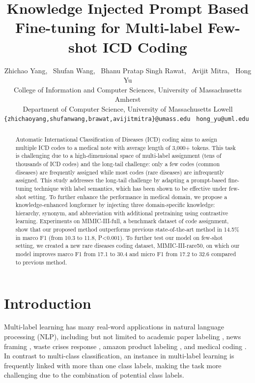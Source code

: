 \documentclass[11pt]{article}
\title{Knowledge Injected Prompt Based Fine-tuning for Multi-label Few-shot ICD Coding}
\author{
Zhichao Yang, \ Shufan Wang, \ Bhanu Pratap Singh Rawat, \ Avijit Mitra, \ Hong Yu \\
 College of Information and Computer Sciences, University of Massachusetts Amherst\\
 Department of Computer Science, University of Massachusetts Lowell\\
{\tt \{zhichaoyang,shufanwang,brawat,avijitmitra\}@umass.edu } {\tt hong\_yu@uml.edu } \\
}
\begin{document}
\maketitle
\begin{abstract}
Automatic International Classification of Diseases (ICD) coding aims to assign multiple ICD codes to a medical note with average length of 3,000+ tokens. This task is challenging due to a high-dimensional space of multi-label assignment (tens of thousands of ICD codes) and the long-tail challenge: only a few codes (common diseases) are frequently assigned while most codes (rare diseases) are infrequently assigned. This study addresses the long-tail challenge by adapting a prompt-based fine-tuning technique with label semantics, which has been shown to be effective under few-shot setting. To further enhance the performance in medical domain, we propose a knowledge-enhanced longformer by injecting three domain-specific knowledge:  hierarchy, synonym, and abbreviation with additional pretraining using contrastive learning. Experiments on MIMIC-III-full, a benchmark dataset of code assignment, show that our proposed method outperforms previous state-of-the-art method in 14.5\% in marco F1 (from 10.3 to 11.8, P<0.001). To further test our model on few-shot setting, we created a new rare diseases coding dataset, MIMIC-III-rare50, on which our model improves marco F1 from 17.1 to 30.4 and micro F1 from 17.2 to 32.6 compared to previous method.






\end{abstract}

\section{Introduction}
Multi-label learning has many real-word applications in natural language processing (NLP), including but not limited to academic paper labeling \citep{chen-etal-2020-hyperbolic}, news framing \citep{akyurek-etal-2020-multi}, waste crises response \citep{Yang2020RiskRF}, amazon product labeling \citep{McAuley2015InferringNO, Dahiya21b}, and medical coding \citep{Atutxa2019InterpretableDL}. In contrast to multi-class classification, an instance in multi-label learning is frequently linked with more than one class labels, making the task more challenging due to the combination of potential class labels. 
\end{document}
